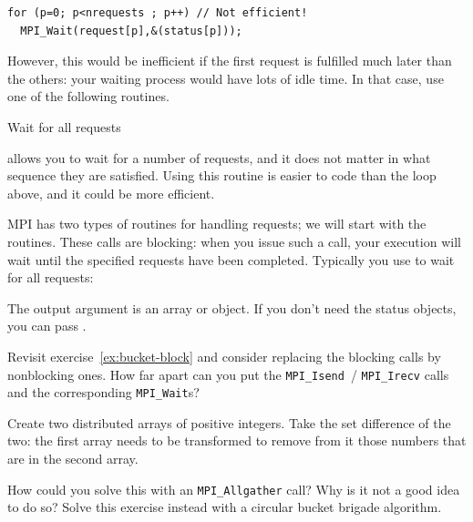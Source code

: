 \begin{lstlisting}
for (p=0; p<nrequests ; p++) // Not efficient!
  MPI_Wait(request[p],&(status[p]));
\end{lstlisting}

However, this would be inefficient if the first request is fulfilled
much later than the others: your waiting process would have lots of
idle time. In that case, use one of the following routines.

 {Wait for all requests}
  
 allows you to wait for a number of
requests, and it does not matter in what sequence they are
satisfied. Using this routine is easier to code than the loop above,
and it could be more efficient.


MPI has two types of routines for handling requests; we will start
with the  routines. These
calls are blocking: when you issue
such a call, your execution will wait until the specified requests
have been completed.
Typically you use
to wait for all requests:
%

The output argument is an array or  object.
If you don't need the status objects, you can pass
.

\begin{exercise}
  \label{ex:bucket-nonblock}
  Revisit exercise~\ref{ex:bucket-block} and consider replacing the
  blocking calls by nonblocking ones. How far apart can you put the
  \lstinline{MPI_Isend}~/ \lstinline{MPI_Irecv} calls and the
  corresponding \lstinline{MPI_Wait}s?
\end{exercise}

\begin{exercise}
  \label{ex:setdiff}
  Create two distributed arrays of positive integers.
  Take the set difference of the two:
  the first array needs to be transformed to remove from it those numbers
  that are in the second array.

  How could you solve this with an \lstinline+MPI_Allgather+ call?
  Why is it not a good idea to do so?
  Solve this exercise instead with a circular bucket brigade algorithm.
\end{exercise}


